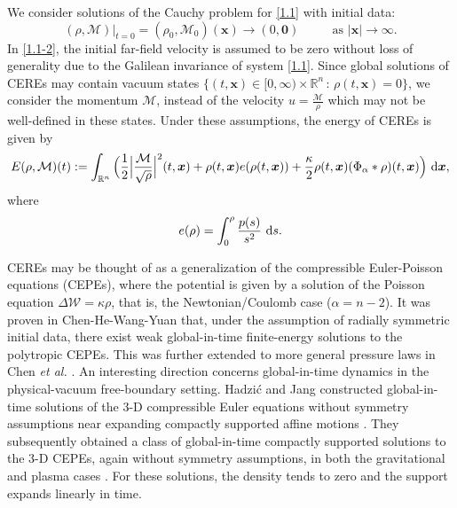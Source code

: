 \documentclass[reqno,11pt]{amsart}
\numberwithin{equation}{section}
\theoremstyle{definition}
\def\dd{{\, \rm d}}
\def\M{{\mathcal{M}}}
\begin{document}
We consider solutions of the Cauchy problem for \eqref{1.1} with initial data:
\begin{equation}\label{1.1-2}
(\rho, \M)|_{t=0}=(\rho_0, \M_0)( \boldsymbol{x})\longrightarrow (0, \boldsymbol{0})
\qquad\,\,\,\,\mbox{as $| \boldsymbol{x}|\to \infty$}.
\end{equation}
In \eqref{1.1-2}, the initial far-field velocity is assumed to be zero
without loss of generality due to the Galilean invariance of system \eqref{1.1}. 
Since global solutions of CEREs may contain vacuum states 
$\{(t,\boldsymbol{x}) \in [0,\infty) \times \mathbb{R}^n\, : \, \rho(t,\boldsymbol{x}) = 0\}$, 
we consider the momentum $\mathcal{M}$, instead of the velocity $u = \frac{\mathcal{M}}{\rho}$ 
which may not be well-defined in these states. 
Under these assumptions, the energy of CEREs is given by
\begin{equation*}
     E(\rho,\mathcal{M})(t): 
     =\int_{\mathbb{R}^n}\Big( \frac{1}{2} \Big|\frac{\mathcal{M}}{\sqrt{\rho}}\Big|^2(t, \boldsymbol{x}) + \rho(t, \boldsymbol{x}) e(\rho(t, \boldsymbol{x}))  
     + \frac{\kappa}{2}\rho(t,\boldsymbol{x})(\Phi_\alpha \ast \rho)(t, \boldsymbol{x})\Big)\,\dd\boldsymbol{x},
\end{equation*}
where
\[
    e(\rho) = \int^\rho_0 \frac{p(s)}{s^2}\,\dd s.
\]

\smallskip

CEREs may be thought of as a generalization of the compressible Euler-Poisson equations (CEPEs), 
where the potential is given by a solution of the Poisson equation $\Delta \mathcal{W} = \kappa \rho$, 
that is, the Newtonian/Coulomb case ($\alpha = n-2$). 
It was proven in Chen-He-Wang-Yuan \cite{Chen2021} that, under the assumption of radially symmetric initial data, 
there exist weak global-in-time finite-energy solutions to the polytropic CEPEs. 
This was further extended to more general pressure laws 
in Chen {\it et al.}  
\cite{Chen_2024}. An interesting direction concerns global-in-time dynamics in the
physical-vacuum free-boundary setting. Hadzi\'c and Jang constructed
global-in-time solutions of the 3-D compressible Euler equations
without symmetry assumptions near expanding compactly supported affine motions
\cite{HadzicJang2018Euler}. They
subsequently obtained a class of global-in-time compactly supported solutions
to the 3-D CEPEs, again without symmetry
assumptions, in both the gravitational and plasma cases
\cite{HadzicJang2019EP}. For these solutions, the density tends to zero and
the support expands linearly in time.
\smallskip
\end{document}
